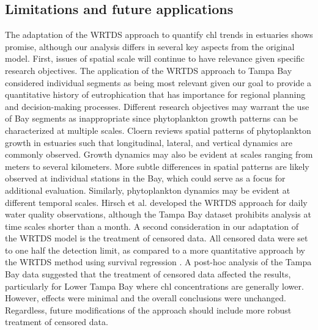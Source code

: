 \documentclass{svjour3}\usepackage[]{graphicx}\usepackage[]{color}
\begin{document}
\subsection{Limitations and future applications}

The adaptation of the \ac{WRTDS} approach to quantify \ac{chl} trends in estuaries shows promise, although our analysis differs in several key aspects from the original model.  First, issues of spatial scale will continue to have relevance given specific research objectives.  The application of the \ac{WRTDS} approach to Tampa Bay considered individual segments as being most relevant given our goal to provide a quantitative history of eutrophication that has importance for regional planning and decision-making processes.  Different research objectives may warrant the use of Bay segments as inappropriate since phytoplankton growth patterns can be characterized at multiple scales.  Cloern \cite{Cloern96} reviews spatial patterns of phytoplankton growth in estuaries such that longitudinal, lateral, and vertical dynamics are commonly observed.  Growth dynamics may also be evident at scales ranging from meters to several kilometers.  More subtle differences in spatial patterns are likely observed at individual stations in the Bay, which could serve as a focus for additional evaluation. Similarly, phytoplankton dynamics may be evident at different temporal scales.  Hirsch et al. \cite{Hirsch10} developed the \ac{WRTDS} approach for daily water quality observations, although the Tampa Bay dataset prohibits analysis at time scales shorter than a month.  A second consideration in our adaptation of the \ac{WRTDS} model is the treatment of censored data.  All censored data were set to one half the detection limit, as compared to a more quantitative approach by the \ac{WRTDS} method using survival regression \cite{Moyer12}.  A post-hoc analysis of the Tampa Bay data suggested that the treatment of censored data affected the results, particularly for Lower Tampa Bay where \ac{chl} concentrations are generally lower.  However, effects were minimal and the overall conclusions were unchanged.  Regardless, future modifications of the approach should include more robust treatment  of censored data.
\end{document}
